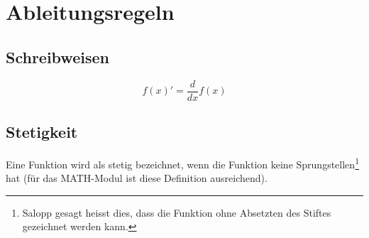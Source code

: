 



\section{Ableitungsregeln}

\subsection{Schreibweisen}
\[ \boxed{f(x)' = \frac{d}{dx} f(x)} \]

\subsection{Stetigkeit}
Eine Funktion wird als stetig bezeichnet, wenn die Funktion keine 
Sprungstellen\footnote{Salopp gesagt heisst dies, dass die Funktion ohne Absetzten des Stiftes gezeichnet werden kann.}
hat (für das MATH-Modul ist diese Definition ausreichend).

